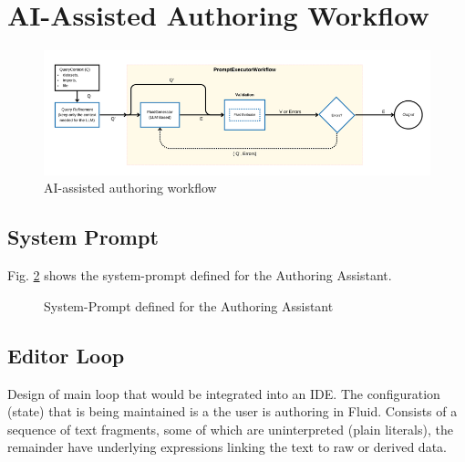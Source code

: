 \section{AI-Assisted Authoring Workflow}
\label{sec:authoring-workflow}

\begin{figure}
    \centering
    \includegraphics[width=0.95\linewidth]{fig/authoring-assistant-architecture.png}
    \caption{AI-assisted authoring workflow}\label{fig:architecture}
\end{figure}

\subsection{System Prompt}
Fig. \ref{fig:system-prompt} shows the system-prompt defined for the Authoring Assistant.
\begin{figure}[h]
    \small
    {}
    \vspace{-0.5em}
    \caption{System-Prompt defined for the Authoring Assistant}
    \label{fig:system-prompt}
\end{figure}



\subsection{Editor Loop}\label{subsec:editor-loop}
Design of main loop that would be integrated into an IDE. The configuration (state) that is being maintained
is a  the user is authoring in Fluid. Consists of a sequence of text fragments, some of which
are uninterpreted (plain literals), the remainder have underlying expressions linking the text to raw or derived
data.

